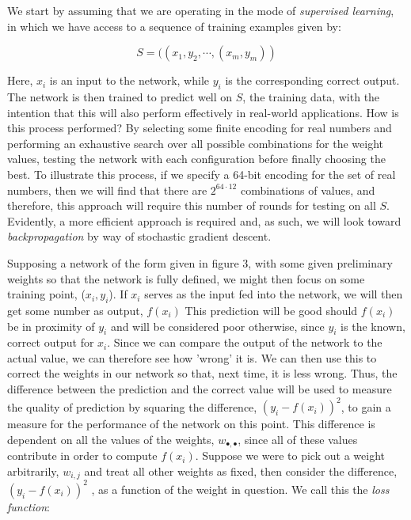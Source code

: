 \documentclass[11pt]{article}
\begin{document}
We start by assuming that we are operating in the mode of \textit{supervised learning}, in which we have access to a sequence of training examples given by:

\begin{equation}S = ((x_{1}, y_{2}, \cdots , (x_{m}, y_{m}))\nonumber\end{equation}

Here, $x_{i}$ is an input to the network, while $y_{i}$ is the corresponding correct output. The network is then trained to predict well on $S$, the training data, with the intention that this will also perform effectively in real-world applications. How is this process performed? By selecting some finite encoding for real numbers and performing an exhaustive search over all possible combinations for the weight values, testing the network with each configuration before finally choosing the best. To illustrate this process, if we specify a 64-bit encoding for the set of real numbers, then we will find that there are $2^{64 \cdot 12}$ combinations of values, and therefore, this approach will require this number of rounds for testing on all $S$. Evidently, a more efficient approach is required and, as such, we will look toward \textit{backpropagation} by way of stochastic gradient descent.

Supposing a network of the form given in figure 3, with some given preliminary weights so that the network is fully defined, we might then focus on some training point, ($x_{i}, y_{i}$). If $x_{i}$ serves as the input fed into the network, we will then get some number as output, $f(x_{i})$ This prediction will be good should $f(x_{i})$ be in proximity of $y_{i}$ and will be considered poor otherwise, since $y_{i}$ is the known, correct output for $x_{i}$.  Since we can compare the output of the network to the actual value, we can therefore see how 'wrong' it is. We can then use this to correct the weights in our network so that, next time, it is less wrong. Thus, the difference between the prediction and the correct value will be used to measure the quality of prediction by squaring the difference, $(y_{i}-f(x_{i}))^2$, to gain a measure for the performance of the network on this point. This difference is dependent on all the values of the weights, $w_{\bullet, \bullet}$, since all of these values contribute in order to compute $f(x_{i})$. Suppose we were to pick out a weight arbitrarily, $w_{i, j}$ and treat all other weights as fixed, then consider the difference, $(y_{i}-f(x_{i}))^2$ , as a function of the weight in question. We call this the \textit{loss function}:
\end{document}
